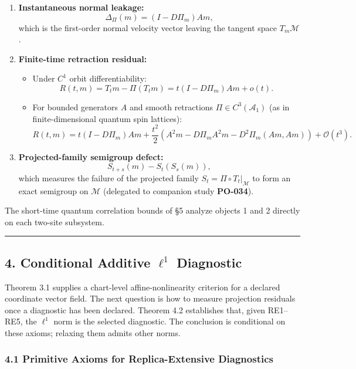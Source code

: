 \documentclass[
  11pt,
]{article}
\providecommand{\tightlist}{%
  \setlength{\itemsep}{0pt}\setlength{\parskip}{0pt}}
\providecommand{\tightlist}{%
  \setlength{\itemsep}{0pt}\setlength{\parskip}{0pt}}
\begin{document}
\begin{enumerate}
\def\labelenumi{\arabic{enumi}.}
\item
  \textbf{Instantaneous normal leakage:}
  \[\Delta_\Pi(m) = (I - D\Pi_m)Am,\]
  which is the first-order normal velocity vector leaving the tangent space \(T_m \mathcal{M}\).
\item
  \textbf{Finite-time retraction residual:}

  \begin{itemize}
  \tightlist
  \item
    Under \(C^1\) orbit differentiability:
    \[R(t, m) = T_t m - \Pi(T_t m) = t(I - D\Pi_m)Am + o(t).\]
  \item
    For bounded generators \(A\) and smooth retractions \(\Pi \in C^3(\mathcal{A}_1)\) (as in finite-dimensional quantum spin lattices):
    \[R(t, m) = t(I - D\Pi_m)Am + \frac{t^2}{2}\left(A^2 m - D\Pi_mA^2 m - D^2\Pi_m(Am, Am)\right) + \mathcal{O}(t^3).\]
  \end{itemize}
\item
  \textbf{Projected-family semigroup defect:}
  \[S_{t+s}(m) - S_t(S_s(m)),\]
  which measures the failure of the projected family \(S_t = \Pi \circ T_t|_{\mathcal{M}}\) to form an exact semigroup on \(\mathcal{M}\) (delegated to companion study \textbf{PO-034}).
\end{enumerate}

The short-time quantum correlation bounds of §5 analyze objects 1 and 2 directly on each two-site subsystem.

\begin{center}\rule{0.5\linewidth}{0.5pt}\end{center}

\subsection{\texorpdfstring{4. Conditional Additive \(\ell^1\) Diagnostic}{4. Conditional Additive \textbackslash ell\^{}1 Diagnostic}}\label{conditional-additive-ell1-diagnostic}

Theorem 3.1 supplies a chart-level affine-nonlinearity criterion for a declared coordinate vector field. The next question is how to measure projection residuals once a diagnostic has been declared. Theorem 4.2 establishes that, given RE1--RE5, the \(\ell^1\) norm is the selected diagnostic. The conclusion is conditional on these axioms; relaxing them admits other norms.

\subsubsection{4.1 Primitive Axioms for Replica-Extensive Diagnostics}\label{primitive-axioms-for-replica-extensive-diagnostics}
\end{document}

